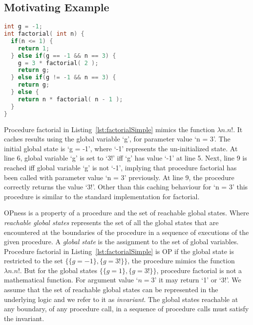 \documentclass{llncs}
\begin{document}
\subsection{Motivating Example}

\begin{lstlisting}[language=c, caption= {Procedure `factorial' :
      returns factorial of `n' and memoizes result for argument value
      `3'.}, label=lst:factorialSimple]
int g = -1;
int factorial( int n) {
  if(n <= 1) {
    return 1;
  } else if(g == -1 && n == 3) {
    g = 3 * factorial( 2 );
    return g;
  } else if(g != -1 && n == 3) {
    return g;
  } else {
    return n * factorial( n - 1 );
  }
}
\end{lstlisting}

Procedure factorial in Listing~\ref{lst:factorialSimple} mimics the
function $\lambda n. n!$. It caches results using the global variable
`g', for parameter value `n = 3'. The initial global state is `g =
-1', where `-1' represents the un-initialized state. At line 6, global
variable `g' is set to `3!' iff `g' has value `-1' at line 5. Next,
line 9 is reached iff global variable `g' is not `-1', implying that
procedure factorial has been called with parameter value `n = 3'
previously. At line 9, the procedure correctly returns the value
`3!'. Other than this caching behaviour for `n = 3' this procedure is
similar to the standard implementation for factorial.

OPness is a property of a procedure and the set of reachable global
states. Where \textit{reachable global states} represents the set of
all the global states that are encountered at the boundaries of the
procedure in a sequence of executions of the given procedure. A
\textit{global state} is the assignment to the set of global
variables. Procedure factorial in Listing~\ref{lst:factorialSimple}
is OP if the global state is restricted to the set $\{\{g = -1\}, \{g
= 3!\}\}$, the procedure mimics the function $\lambda n.n!$. But for
the global states $\{\{g = 1\}, \{g = 3!\}\}$, procedure factorial
is not a mathematical function. For argument value `$n = 3$' it may
return `1' or `3!'.  We assume that the set of reachable global states
can be represented in the underlying logic and we refer to it as
\textit{invariant}.  The global states reachable at any boundary, of
any procedure call, in a sequence of procedure calls must satisfy the
invariant.
\end{document}
